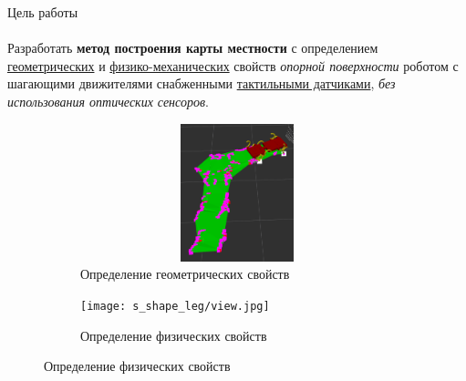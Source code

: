 


\begin{frame}[t]{Цель работы}
    \framesubtitle{}
    Разработать \textbf{метод построения карты местности} с определением \underline{геометрических} и \underline{физико-механических} свойств \textit{опорной поверхности} роботом с шагающими движителями снабженными \underline{тактильными датчиками}, \textit{без использования оптических сенсоров}.
    \begin{figure}[H]
        \begin{subfigure}{0.49\textwidth}
            \centering\includegraphics[height=4cm,width=1\textwidth,keepaspectratio]{../images/slides/geom_prop.png}
            \caption*{Определение геометрических свойств}
        \end{subfigure}
        \begin{subfigure}{0.49\textwidth}
            \centering\texttt{[image: s\_shape\_leg/view.jpg]}
            \caption*{Определение физических свойств}
        \end{subfigure}
    \end{figure}
\end{frame}


